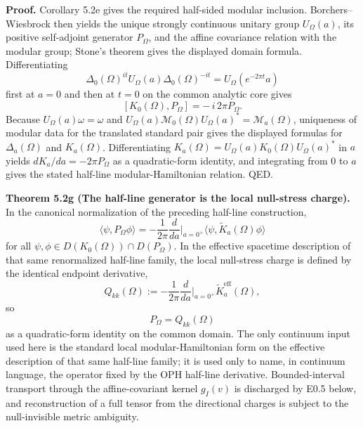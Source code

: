 \textbf{Proof.} Corollary 5.2e gives the required half-sided modular inclusion. Borchers--Wiesbrock then yields the unique strongly continuous unitary group \(U_\Omega(a)\), its positive self-adjoint generator \(P_\Omega\), and the affine covariance relation with the modular group; Stone's theorem gives the displayed domain formula. Differentiating
\[
\Delta_0(\Omega)^{it}U_\Omega(a)\Delta_0(\Omega)^{-it}
=
U_\Omega(e^{-2\pi t}a)
\]
first at \(a=0\) and then at \(t=0\) on the common analytic core gives
\[
[K_0(\Omega),P_\Omega]=-\,i\,2\pi P_\Omega.
\]
Because \(U_\Omega(a)\omega=\omega\) and \(U_\Omega(a)\mathcal M_0(\Omega)U_\Omega(a)^*=\mathcal M_a(\Omega)\), uniqueness of modular data for the translated standard pair gives the displayed formulas for \(\Delta_a(\Omega)\) and \(K_a(\Omega)\). Differentiating \(K_a(\Omega)=U_\Omega(a)K_0(\Omega)U_\Omega(a)^*\) in \(a\) yields \(dK_a/da=-2\pi P_\Omega\) as a quadratic-form identity, and integrating from \(0\) to \(a\) gives the stated half-line modular-Hamiltonian relation. QED.

\textbf{Theorem 5.2g (The half-line generator is the local null-stress charge).} In the canonical normalization of the preceding half-line construction,
\[
\langle\psi,P_\Omega\phi\rangle
=
-\frac{1}{2\pi}\frac{d}{da}\Big|_{a=0^+}
\langle\psi,\widetilde K_a(\Omega)\phi\rangle
\]
for all \(\psi,\phi\in D(K_0(\Omega))\cap D(P_\Omega)\). In the effective spacetime description of that same renormalized half-line family, the local null-stress charge is defined by the identical endpoint derivative,
\[
Q_{kk}(\Omega)
:=
-\frac{1}{2\pi}\frac{d}{da}\Big|_{a=0^+}\widetilde K^{\mathrm{eff}}_a(\Omega),
\]
so
\[
P_\Omega = Q_{kk}(\Omega)
\]
as a quadratic-form identity on the common domain. The only continuum input used here is the standard local modular-Hamiltonian form on the effective description of that same half-line family; it is used only to name, in continuum language, the operator fixed by the OPH half-line derivative. Bounded-interval transport through the affine-covariant kernel \(g_I(v)\) is discharged by E0.5 below, and reconstruction of a full tensor from the directional charges is subject to the null-invisible metric ambiguity.

